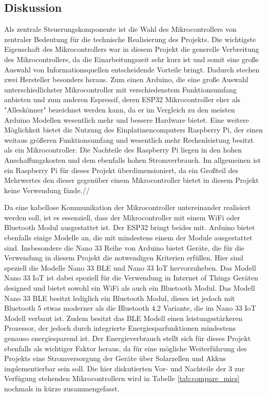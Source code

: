     \subsection{Diskussion}
        Als zentrale Steuerungskomponente ist die Wahl des Mikrocontrollers von zentraler Bedeutung für die technische Realisierung des Projekts. Die wichtigste Eigenschaft des Mikrocontrollers war in diesem Projekt die generelle Verbreitung des Mikrocontrollers, da die Einarbeitungszeit sehr kurz ist und somit eine große Auswahl von Informationsquellen entscheidende Vorteile bringt. Dadurch stechen zwei Hersteller besonders heraus. Zum einen Arduino, die eine große Auswahl unterschiedlichster Mikrocontroller mit verschiedenstem Funktionsumfang anbieten und zum anderen Espressif, deren ESP32 Mikrocontroller eher als "Alleskönner" bezeichnet werden kann, da er im Vergleich zu den meisten Arduino Modellen wesentlich mehr und bessere Hardware bietet.
        Eine weitere Möglichkeit bietet die Nutzung des Einplatinencomputers Raspberry Pi, der einen weitaus größeren Funktionsumfang und wesentlich mehr Rechenleistung besitzt als ein Mikrocontroller. Die Nachteile des Raspberry Pi liegen in den hohen Anschaffungskosten und dem ebenfalls hohen Stromverbrauch. Im allgemeinen ist ein Raspberry Pi für dieses Projekt überdimensioniert, da ein Großteil des Mehrwertes den dieser gegenüber einem Mikrocontroller bietet in diesem Projekt keine Verwendung fände.//
        
        Da eine kabellose Kommunikation der Mikrocontroller untereinander realisiert werden soll, ist es essenziell, dass der Mikrocontroller mit einem WiFi oder Bluetooth Modul ausgestattet ist. Der ESP32 bringt beides mit. Arduino bietet ebenfalls einige Modelle an, die mit mindestens einem der Module ausgestattet sind. Insbesondere die Nano 33 Reihe von Arduino bietet Geräte, die für die Verwendung in diesem Projekt die notwendigen Kriterien erfüllen. Hier sind speziell die Modelle Nano 33 BLE und Nano 33 IoT hervorzuheben. Das Modell Nano 33 IoT ist dabei speziell für die Verwendung in Internet of Things Geräten designed und bietet sowohl ein WiFi als auch ein Bluetooth Modul. Das Modell Nano 33 BLE besitzt lediglich ein Bluetooth Modul, dieses ist jedoch mit Bluetooth 5 etwas moderner als die Bluetooth 4.2 Variante, die im Nano 33 IoT Modell verbaut ist. Zudem besitzt das BLE Modell einen leistungsstärkeren Prozessor, der jedoch durch integrierte Energiesparfunktionen mindestens genauso energiesparend ist. Der Energieverbrauch stellt sich für dieses Projekt ebenfalls als wichtiger Faktor heraus, da für eine mögliche Weiterführung des Projekts eine Stromversorgung der Geräte über Solarzellen und Akkus implementierbar sein soll. Die hier diskutierten Vor- und Nachteile der 3 zur Verfügung stehenden Mikrocontrollern wird in Tabelle \ref{tab:compare_mics} nochmals in kürze zusammengefasst.


